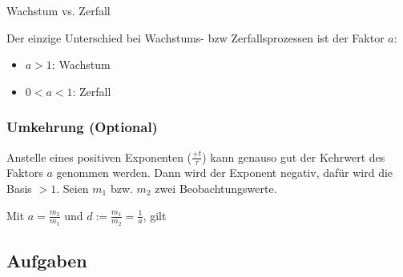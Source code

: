 \begin{bemerkung}{Wachstum vs. Zerfall}{}

  Der einzige Unterschied bei Wachstums- bzw Zerfallsprozessen ist der
  Faktor $a$:

  \begin{itemize}
  \item $a>1$: Wachstum
  \item $0<a<1$: Zerfall
    \end{itemize}
  
  \end{bemerkung}
\newpage

\subsubsection{Umkehrung (Optional)}
Anstelle eines  positiven Exponenten ($\frac{+t}{\tau}$) kann genauso
gut der Kehrwert des Faktors $a$ genommen werden. Dann wird der
Exponent negativ, dafür wird die Basis $> 1$. Seien $m_1$ bzw. $m_2$
zwei Beobachtungswerte.

Mit $a = \frac{m_2}{m_1}$ und $d := \frac{m_1}{m_2} = \frac{1}{a}$, gilt

\begin{center}
\end{center}


\newpage



\newpage



\subsection*{Aufgaben}
\newpage

